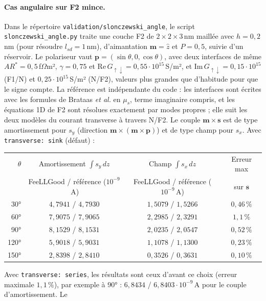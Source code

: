 \documentclass[11pt,a4paper]{article}
\newcommand{\vm}{\bm{m}}
\newcommand{\vp}{\bm{p}}
\newcommand{\vs}{\bm{s}}
\begin{document}
\paragraph{Cas angulaire sur F2 mince.} Dans le répertoire
\texttt{validation/slonczewski\_angle}, le script
\texttt{slonczewski\_angle.py} traite une
couche F2 de $2\times2\times3$\,nm maillée avec $h=0{,}2$\,nm (pour
résoudre $l_{sd}=1$\,nm), d'aimantation $\vm=\hat z$ et $P=0{,}5$, suivie
d'un réservoir. Le polariseur vaut $\vp = (\sin\theta, 0, \cos\theta)$,
avec deux interfaces de même $AR^*=0{,}5$\,f$\Omega$m², $\gamma=0{,}75$ et
$\mathrm{Re}\,G_{\uparrow\downarrow}=0{,}55\cdot10^{15}$\,S/m², et
$\mathrm{Im}\,G_{\uparrow\downarrow} = 0{,}15\cdot10^{15}$ (F1/N) et
$0{,}25\cdot10^{15}$\,S/m² (N/F2), valeurs plus grandes que d'habitude pour
que le signe compte. La référence est indépendante du code : les interfaces
sont écrites avec les formules de Brataas \emph{et al.} en $\mu_s$, terme
imaginaire compris, et les équations 1D de F2 sont résolues exactement par
modes propres ; elle suit les deux modèles du courant transverse à travers
N/F2. Le couple $\vm\times\vs$ est de type amortissement pour $s_y$
(direction $\vm\times(\vm\times\vp)$) et de type champ pour $s_x$. Avec
\texttt{transverse: sink} (défaut) :
\begin{center}
\renewcommand{\arraystretch}{1.2}
\begin{tabular}{rccc}
  \toprule
  $\theta$ & Amortissement $\int s_y\,dz$ & Champ $\int s_x\,dz$ & Erreur max \\
  & FeeLLGood / référence ($10^{-9}$\,A) & FeeLLGood / référence ($10^{-9}$\,A) & sur $\vs$ \\
  \midrule
  30° & $4{,}7941$ / $4{,}7930$ & $1{,}5079$ / $1{,}5266$ & $0{,}46\,\%$ \\
  60° & $7{,}9075$ / $7{,}9065$ & $2{,}2985$ / $2{,}3291$ & $1{,}1\,\%$ \\
  90° & $8{,}1529$ / $8{,}1531$ & $2{,}0235$ / $2{,}0547$ & $0{,}52\,\%$ \\
  120° & $5{,}9018$ / $5{,}9031$ & $1{,}1078$ / $1{,}1300$ & $0{,}23\,\%$ \\
  150° & $2{,}8398$ / $2{,}8410$ & $0{,}3526$ / $0{,}3631$ & $0{,}10\,\%$ \\
  \bottomrule
\end{tabular}
\end{center}
Avec \texttt{transverse: series}, les résultats sont ceux d'avant ce choix
(erreur maximale $1{,}1\,\%$), par exemple à 90° :
$6{,}8434$ / $6{,}8403\cdot10^{-9}$\,A pour le couple d'amortissement. Le
\end{document}
